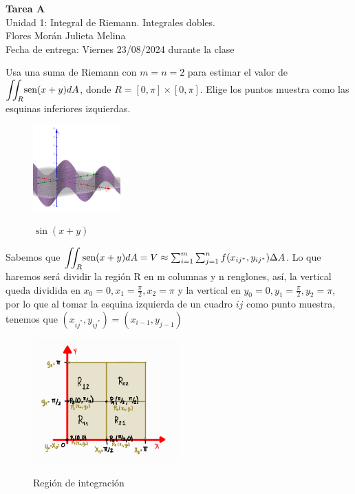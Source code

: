 \documentclass[12pt]{exam}
\begin{document}
\centering


\Large 
\textbf{Tarea A}\\
\large 
Unidad 1: Integral de Riemann. Integrales dobles.\\
Flores Morán Julieta Melina \\
\normalsize
Fecha de entrega: 
Viernes 23/08/2024 durante la clase




\vskip10pt
\normalsize

\pointformat{\bfseries\boldmath(\thepoints)}
\vskip10pt

    
    \begin{questions}

     \question
         Usa una suma de Riemann con $m=n=2$ para estimar el valor de $\mathlarger{\iint}_R\text{sen}(x+y)dA$, donde $R=[0,\pi]\times[0,\pi]$. Elige los puntos muestra como las esquinas inferiores izquierdas.
    \begin{figure}[h]
      \centering
      \includegraphics[width=0.3\textwidth]{./img/i1e1.png}
      \label{fig:sen1}
      \caption{$\sin{(x+y)}$}
    \end{figure}

    Sabemos que $\mathlarger{\iint}_{R}\text{sen}(x+y)dA = V  \approx \sum_{i=1}^{m}\sum_{j=1}^{n} f(x_{{ij}^*},y_{{ij}^*})\Delta A $.
  Lo que haremos será dividir la región R en m columnas y n renglones, así, la vertical queda dividida en $x_0=0, x_1=\frac{\pi}{2}, x_2=\pi$ y la vertical en $y_0=0, y_1=\frac{\pi}{2}, y_2=\pi$, por lo que al tomar la esquina izquierda de un cuadro $ij$ como punto muestra, tenemos que $(x_{{ij}^*},y_{{ij}^*}) = (x_{i-1}, y_{j-1})$
\begin{figure}[h]
      \centering
      \includegraphics[width=0.5\textwidth]{./img/i2e1.png}
      \label{fig:región}
      \caption{Región de integración}
\end{figure}


\end{questions}
\end{document}
